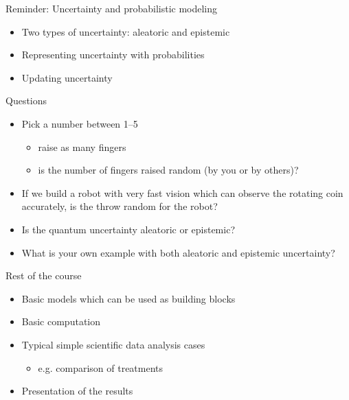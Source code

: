 \documentclass[10pt,handout]{beamer}
\begin{document}
\begin{frame}{Reminder: Uncertainty and probabilistic modeling}

  \begin{itemize}
  \item Two types of uncertainty: aleatoric and epistemic
    \vspace{\baselineskip}
  \item Representing uncertainty with probabilities
    \vspace{\baselineskip}
  \item Updating uncertainty
    \vspace{\baselineskip}
   \end{itemize}
\end{frame}

\begin{frame}{Questions}

  \begin{itemize}
  \item<1-> Pick a number between 1--5
    \begin{itemize}
    \item<2-> raise as many fingers
    \item<3-> is the number of fingers raised random (by you or by others)?
    \end{itemize}
    \vspace{\baselineskip}
  \item<4-> If we build a robot with very fast vision which can observe
    the rotating coin accurately, is the throw random for the robot?
    \vspace{\baselineskip}
  \item<5-> Is the quantum uncertainty aleatoric or epistemic?
    \vspace{\baselineskip}
  \item<6-> What is your own example with both aleatoric and epistemic
    uncertainty?
  \end{itemize}
\end{frame}

\begin{frame}{Rest of the course}

  \begin{itemize}
  \item Basic models which can be used as building blocks
    \vspace{\baselineskip}
  \item Basic computation
    \vspace{\baselineskip}
  \item Typical simple scientific data analysis cases
     \begin{itemize}
     \item e.g. comparison of treatments
     \end{itemize}
    \vspace{\baselineskip}
  \item Presentation of the results
  \end{itemize}
\end{frame}
\end{document}
